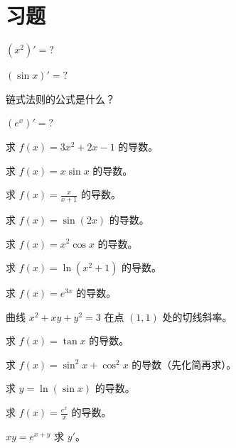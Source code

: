 \section{习题}
\begin{exercise}[0] \((x^2)'=?\) \end{exercise}
\begin{exercise}[0] \((\sin x)'=?\) \end{exercise}
\begin{exercise}[0] 链式法则的公式是什么？\end{exercise}
\begin{exercise}[0] \((e^x)'=?\) \end{exercise}
\begin{exercise}[1] 求 \(f(x)=3x^2+2x-1\) 的导数。\end{exercise}
\begin{exercise}[1] 求 \(f(x)=x\sin x\) 的导数。\end{exercise}
\begin{exercise}[1] 求 \(f(x)=\frac{x}{x+1}\) 的导数。\end{exercise}
\begin{exercise}[1] 求 \(f(x)=\sin(2x)\) 的导数。\end{exercise}
\begin{exercise}[2] 求 \(f(x)=x^2\cos x\) 的导数。\end{exercise}
\begin{exercise}[2] 求 \(f(x)=\ln(x^2+1)\) 的导数。\end{exercise}
\begin{exercise}[2] 求 \(f(x)=e^{3x}\) 的导数。\end{exercise}
\begin{exercise}[2] 曲线 \(x^2+xy+y^2=3\) 在点 \((1,1)\) 处的切线斜率。\end{exercise}
\begin{exercise}[3] 求 \(f(x)=\tan x\) 的导数。\end{exercise}
\begin{exercise}[3] 求 \(f(x)=\sin^2 x + \cos^2 x\) 的导数（先化简再求）。\end{exercise}
\begin{exercise}[3] 求 \(y=\ln(\sin x)\) 的导数。\end{exercise}
\begin{exercise}[3] 求 \(f(x)=\frac{e^x}{x}\) 的导数。\end{exercise}
\begin{exercise}[3] \(xy=e^{x+y}\) 求 \(y'\)。\end{exercise}
